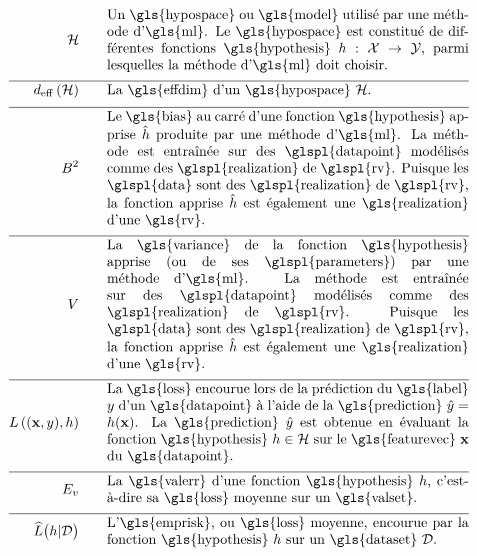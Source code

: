 \begin{align}
	\hypospace  \quad\quad & \parbox{.75\textwidth}{Un \gls{hypospace} ou \gls{model} utilisé par une méthode d’\gls{ml}. Le \gls{hypospace} est constitué de différentes fonctions \gls{hypothesis} $\hypothesis: \featurespace \rightarrow \labelspace$, parmi lesquelles la méthode d’\gls{ml} doit choisir.}   \nonumber \\[2mm] \hline \nonumber\\[-5mm]
	\effdim{\hypospace}  \quad\quad & \parbox{.75\textwidth}{La \gls{effdim} d’un \gls{hypospace} $\hypospace$.}   \nonumber \\[2mm] \hline \nonumber\\[-5mm]
	\biasterm^2 \quad\quad &\parbox{.75\textwidth}{
		Le \gls{bias} au carré d’une fonction \gls{hypothesis} apprise $\learnthypothesis$ produite par une méthode d’\gls{ml}. La méthode est entraînée sur des \glspl{datapoint} modélisés comme des \glspl{realization} de \glspl{rv}. Puisque les \glspl{data} sont des \glspl{realization} de \glspl{rv}, la fonction apprise $\learnthypothesis$ est également une \gls{realization} d’une \gls{rv}.} \nonumber  \\[2mm] \hline \nonumber\\[-5mm]
	\varianceterm \quad\quad &\parbox{.75\textwidth}{La \gls{variance} de la fonction \gls{hypothesis} apprise (ou de ses \glspl{parameters}) par une méthode d’\gls{ml}. La méthode est entraînée sur des \glspl{datapoint} modélisés comme des \glspl{realization} de \glspl{rv}. Puisque les \glspl{data} sont des \glspl{realization} de \glspl{rv}, la fonction apprise $\learnthypothesis$ est également une \gls{realization} d’une \gls{rv}.} \nonumber \\[2mm] \hline \nonumber\\[-5mm]
	\lossfunc{(\featurevec,\truelabel)}{\hypothesis}  \quad\quad & \parbox{.75\textwidth}{La \gls{loss} encourue lors de la prédiction du \gls{label} $\truelabel$ d’un \gls{datapoint} à l’aide de la \gls{prediction} $\hat{\truelabel}=h(\featurevec)$. La \gls{prediction} $\hat{\truelabel}$ est obtenue en évaluant la fonction \gls{hypothesis} $\hypothesis \in \hypospace$ sur le \gls{featurevec} $\featurevec$ du \gls{datapoint}.} \nonumber \\[2mm] \hline \nonumber\\[-5mm] 
	\valerror \quad\quad &\parbox{.75\textwidth}{La \gls{valerr} d’une fonction \gls{hypothesis} $\hypothesis$, c’est-à-dire sa \gls{loss} moyenne sur un \gls{valset}.}  \nonumber \\[2mm] \hline \nonumber\\[-5mm]
	\emperror\big(\hypothesis| \dataset \big) \quad\quad &\parbox{.75\textwidth}{L’\gls{emprisk}, ou \gls{loss} moyenne, encourue par la fonction \gls{hypothesis} $\hypothesis$ sur un \gls{dataset} $\dataset$.} \nonumber                           
\end{align}
    

